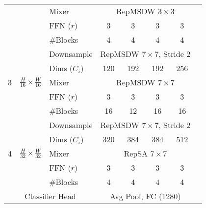 \begin{table}[ht]
\begin{center}
\begin{tabular}{cccccccc}
\cline{3-7} 
\multicolumn{1}{l|}{} & \multicolumn{1}{l|}{} & \multicolumn{1}{l|}{Mixer}  & \multicolumn{4}{c}{ RepMSDW $3 \times 3$ }  \\
\cline{3-7}
\multicolumn{1}{l|}{} & \multicolumn{1}{l|}{} & \multicolumn{1}{l|}{FFN ($r$)}  & \multicolumn{1}{c|}{3} & \multicolumn{1}{c|}{3} & \multicolumn{1}{c|}{3} & \multicolumn{1}{c}{3}   \\ 
\cline{3-7} 
\multicolumn{1}{l|}{} & \multicolumn{1}{l|}{} & \multicolumn{1}{l|}{\#Blocks} & \multicolumn{1}{c|}{4}  & \multicolumn{1}{c|}{4}  & \multicolumn{1}{c|}{4} & \multicolumn{1}{c}{4} \\ 
\hline
\multicolumn{1}{l|}{\multirow{5}{*}{3}} & \multicolumn{1}{l|}{\multirow{5}{*}{$\frac{H}{16}\times\frac{W}{16}$}} & \multicolumn{1}{l|}{Downsample} & \multicolumn{4}{c}{RepMSDW $7 \times 7$, Stride 2} \\ 
\cline{4-7} 
\multicolumn{1}{l|}{} & \multicolumn{1}{l|}{} & \multicolumn{1}{l|}{Dims ($C_i$)} & \multicolumn{1}{c|}{120} & \multicolumn{1}{c|}{192}  & \multicolumn{1}{c|}{192} & \multicolumn{1}{c}{256}  \\ 
\cline{3-7} 
\multicolumn{1}{l|}{} & \multicolumn{1}{l|}{} & \multicolumn{1}{l|}{Mixer}  & \multicolumn{4}{c}{ RepMSDW $7 \times 7$ }  \\
\cline{3-7}
\multicolumn{1}{l|}{} & \multicolumn{1}{l|}{} & \multicolumn{1}{l|}{FFN ($r$)}  & \multicolumn{1}{c|}{3} & \multicolumn{1}{c|}{3} & \multicolumn{1}{c|}{3} & \multicolumn{1}{c}{3}   \\ 
\cline{3-7}
\multicolumn{1}{l|}{} & \multicolumn{1}{l|}{} & \multicolumn{1}{l|}{\#Blocks} & \multicolumn{1}{c|}{16}  & \multicolumn{1}{c|}{12}  & \multicolumn{1}{c|}{16} & \multicolumn{1}{c}{16} \\ 
\hline
\multicolumn{1}{l|}{\multirow{5}{*}{4}} & \multicolumn{1}{l|}{\multirow{5}{*}{$\frac{H}{32}\times\frac{W}{32}$}} & \multicolumn{1}{l|}{Downsample} & \multicolumn{4}{c}{RepMSDW $7 \times 7$, Stride 2} \\ 
\cline{4-7} 
\multicolumn{1}{l|}{} & \multicolumn{1}{l|}{} & \multicolumn{1}{l|}{Dims ($C_i$)} & \multicolumn{1}{c|}{320} & \multicolumn{1}{c|}{384}  & \multicolumn{1}{c|}{384} & \multicolumn{1}{c}{512}  \\ 
\cline{3-7} 
\multicolumn{1}{l|}{} & \multicolumn{1}{l|}{} & \multicolumn{1}{l|}{Mixer}  & \multicolumn{4}{c}{ RepSA $7 \times 7$ }  \\
\cline{3-7}
\multicolumn{1}{l|}{} & \multicolumn{1}{l|}{} & \multicolumn{1}{l|}{FFN ($r$)}  & \multicolumn{1}{c|}{3} & \multicolumn{1}{c|}{3} & \multicolumn{1}{c|}{3} & \multicolumn{1}{c}{3}   \\ 
\cline{3-7} 
\multicolumn{1}{l|}{} & \multicolumn{1}{l|}{} & \multicolumn{1}{l|}{\#Blocks} & \multicolumn{1}{c|}{4}  & \multicolumn{1}{c|}{4}  & \multicolumn{1}{c|}{4} & \multicolumn{1}{c}{4} \\ 
\hline
\multicolumn{3}{c|}{Classifier Head} & \multicolumn{4}{c}{Avg Pool, FC (1280) }\\ \hline
\end{tabular}
\label{tab:arch_variant}
\end{center}
\end{table}



